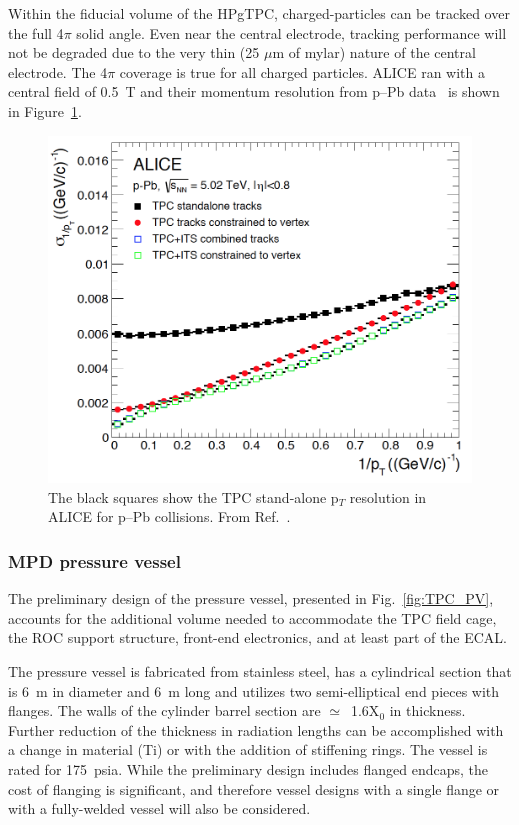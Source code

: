 Within the fiducial volume of the HPgTPC, charged-particles can be tracked over the full 4$\pi$ solid angle.  Even near the central electrode,  tracking performance will not be degraded due to the very thin (25 $\mu$m of mylar) nature of the central electrode.  The 4$\pi$ coverage is true for all charged particles.  ALICE ran with a central field of 0.5~T and their momentum resolution from p--Pb data~\cite{Abelev:2014ffa} is shown in Figure~\ref{fig:ALICE_MOMres}.

\begin{figure}[h]
\centering 
\includegraphics[width=0.85\columnwidth]{graphics/ALICE_mom_res.png} 
\caption{The black squares show the TPC stand-alone p$_T$ resolution in ALICE for p--Pb collisions. From Ref.~\cite{Abelev:2014ffa}.} 
\label{fig:ALICE_MOMres} 
\end{figure}

\subsubsection{MPD pressure vessel}\label{sec:TPC_PV}

The preliminary design of the pressure vessel, presented in Fig.~\ref{fig:TPC_PV}, accounts for the additional volume needed to accommodate the TPC field cage, the ROC support structure, front-end electronics, and at least part of the ECAL.

The pressure vessel is fabricated from stainless steel, has a cylindrical section that is 6~m in diameter and 6~m long and utilizes two semi-elliptical end pieces with flanges. The walls of the cylinder barrel section are $\simeq$~1.6X$_0$ in thickness.  Further reduction of the thickness in radiation lengths can be accomplished with a change in material (Ti) or with the addition of stiffening rings.  The vessel is rated for 175~psia.  While the preliminary design includes flanged endcaps, the cost of flanging is significant, and therefore vessel designs with a single flange or with a fully-welded vessel will also be considered.  


